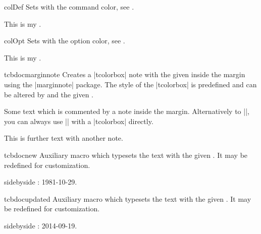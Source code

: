 %
\begin{docCommand}{colDef}{}
Sets  with the command color, see .
\begin{dispExample}
This is my .
\end{dispExample}
\end{docCommand}

\begin{docCommand}{colOpt}{}
  Sets  with the option color, see .
\begin{dispExample}
This is my .
\end{dispExample}
\end{docCommand}

\clearpage

\begin{docCommand}[doc new=2014-09-19]{tcbdocmarginnote}{}
  Creates a |tcolorbox| note with the given  inside the margin using
  the |marginnote| package. The style of the |tcolorbox| is predefined and can be
  altered by  and the given .
\begin{dispExample}
Some text
which is commented by a note inside the margin.
Alternatively to |\tcbdocmarginnote|, you can always use
|\marginnote| with a |tcolorbox| directly.\par
This is further text%
with another note.
\end{dispExample}
\end{docCommand}

\begin{docCommand}[doc new=2014-09-19]{tcbdocnew}{}
  Auxiliary macro which typesets the  text with
  the given . It may be redefined for customization.
  \makeatletter\renewcommand*{\tcbdocnew}[1]{\kvtcb@text@new: #1}\makeatother%
\begin{dispExample*}{sidebyside}
\tcbdocnew{1981-10-29}.
\tcbdocmarginnote{\tcbdocnew{1978-02-09}}
\end{dispExample*}
\end{docCommand}

\begin{docCommand}[doc new=2014-09-19]{tcbdocupdated}{}
  Auxiliary macro which typesets the  text with
  the given . It may be redefined for customization.
  \makeatletter\renewcommand*{\tcbdocupdated}[1]{\kvtcb@text@updated: #1}\makeatother%
\begin{dispExample*}{sidebyside}
\tcbdocupdated{2014-09-19}.
\end{dispExample*}
\end{docCommand}


